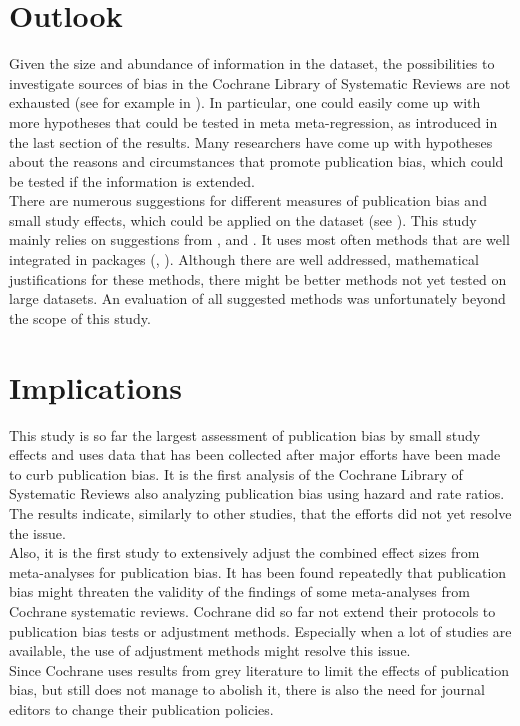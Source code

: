 \documentclass[11pt,a4paper,twoside]{book}\usepackage[]{graphicx}\usepackage[]{color}
\begin{document}
\section{Outlook}
Given the size and abundance of information in the dataset, the possibilities to investigate sources of bias in the Cochrane Library of Systematic Reviews are not exhausted (see for example in \citet{ioannidis.2017}). In particular, one could easily come up with more hypotheses that could be tested in meta meta-regression, as introduced in the last section of the results. Many researchers have come up with hypotheses about the reasons and circumstances that promote publication bias, which could be tested if the information is extended.\\
There are numerous suggestions for different measures of publication bias and small study effects, which could be applied on the dataset (see \citet{mueller.2016}). This study mainly relies on suggestions from \citet{Sterne}, \citet{Ioannidis2007} and \citet{limitmeta}. It uses most often methods that are well integrated in packages (\citet{metafor.package}, \citet{meta.package}). Although there are well addressed, mathematical justifications for these methods, there might be better methods not yet tested on large datasets. An evaluation of all suggested methods was unfortunately beyond the scope of this study.


\section{Implications}
This study is so far the largest assessment of publication bias by small study effects and uses data that has been collected after major efforts have been made to curb publication bias. It is the first analysis of the Cochrane Library of Systematic Reviews also analyzing publication bias using hazard and rate ratios. The results indicate, similarly to other studies, that the efforts did not yet resolve the issue. \\
Also, it is the first study to extensively adjust the combined effect sizes from meta-analyses for publication bias. It has been found repeatedly that publication bias might threaten the validity of the findings of some meta-analyses from Cochrane systematic reviews. Cochrane did so far not extend their protocols to publication bias tests or adjustment methods. Especially when a lot of studies are available, the use of adjustment methods might resolve this issue. \\
Since Cochrane uses results from grey literature to limit the effects of publication bias, but still does not manage to abolish it, there is also the need for journal editors to change their publication policies.
\end{document}
